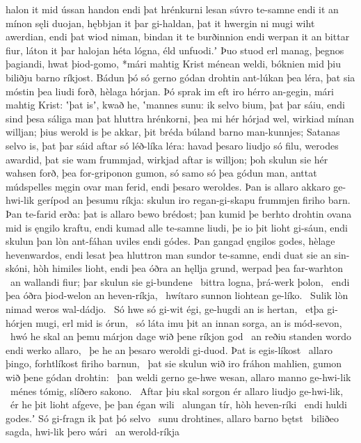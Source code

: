 halon it mid ússan handon endi þat hrénkurni lesan
súvro te-samne endi it an mínon sęli duojan,
hębbjan it þar gi-haldan, þat it hwergin ni mugi
wiht awerdian, endi þat wiod niman,
bindan it te burðinnion endi werpan it an bittar fiur,
láton it þar halojan héta lógna,
éld unfuodi.ʼ Þuo stuod erl manag,
þegnos þagiandi, hwat þiod-gomo,
*mári mahtig Krist ménean weldi,
bóknien mid þiu biliðju barno ríkjost.
Bádun þó só gerno gódan drohtin
ant-lúkan þea léra, þat sia móstin þea liudi forð,
hèlaga hórjan. Þó sprak im eft iro hérro an-gegin,
mári mahtig Krist: ʽþat isʼ, kwað he, ʽmannes sunu:
ik selvo bium, þat þar sáiu, endi sind þesa sáliga man
þat hluttra hrénkorni, þea mi hér hórjad wel,
wirkiad mínan willjan; þius werold is þe akkar,
þit bréda búland barno man-kunnjes;
Satanas selvo is, þat þar sáid aftar
só léð-líka léra: havad þesaro liudjo só filu,
werodes awardid, þat sie wam frummjad,
wirkjad aftar is willjon; þoh skulun sie hér wahsen forð,
þea for-griponon gumon, só samo só þea gódun man,
anttat múdspelles męgin ovar man ferid,
endi þesaro weroldes. Þan is allaro akkaro ge-hwi-lik
gerípod an þesumu ríkja: skulun iro regan-gi-skapu
frummjen firiho barn. Þan te-farid erða:
þat is allaro bewo brédost; þan kumid þe berhto drohtin
ovana mid is ęngilo kraftu, endi kumad alle te-samne
liudi, þe io þit lioht gi-sáun, endi skulun þan lòn ant-fáhan
uviles endi gódes. Þan gangad ęngilos godes,
hèlage hevenwardos, endi lesat þea hluttron man
sundor te-samne, endi duat sie an sin-skóni,
hòh himiles lioht, endi þea óðra an hęllja grund,
werpad þea far-warhton \hld\ an wallandi fiur;
þar skulun sie gi-bundene \hld\ bittra logna,
þrá-werk þolon, \hld\ endi þea óðra þiod-welon
an heven-ríkja, \hld\ hwítaro sunnon
liohtean ge-líko. \hld\ Sulik lòn nimad
weros wal-dádjo. \hld\ Só hwe só gi-wit égi,
ge-hugdi an is hertan, \hld\ etþa gi-hórjen mugi,
erl mid is órun, \hld\ só láta imu þit an innan sorga,
an is mód-sevon, \hld\ hwó he skal an þemu márjon dage
wið þene ríkjon god \hld\ an reðiu standen
wordo endi werko allaro, \hld\ þe he an þesaro weroldi gi-duod.
Þat is egis-líkost \hld\ allaro þingo,
forhtlíkost firiho barnun, \hld\ þat sie skulun wið iro fráhon mahlien,
gumon wið þene gódan drohtin: \hld\ þan weldi gerno ge-hwe wesan,
allaro manno ge-hwi-lik \hld\ ménes tómig,
slíðero sakono. \hld\ Aftar þiu skal sorgon ér
allaro liudjo ge-hwi-lik, \hld\ ér he þit lioht afgeve,
þe þan égan wili \hld\ alungan tír,
hòh heven-ríki \hld\ endi huldi godes.ʼ
Só gi-fragn ik þat þó selvo \hld\ sunu drohtines,
allaro barno bętst \hld\ biliðeo sagda,
hwi-lik þero wári \hld\ an werold-ríkja
